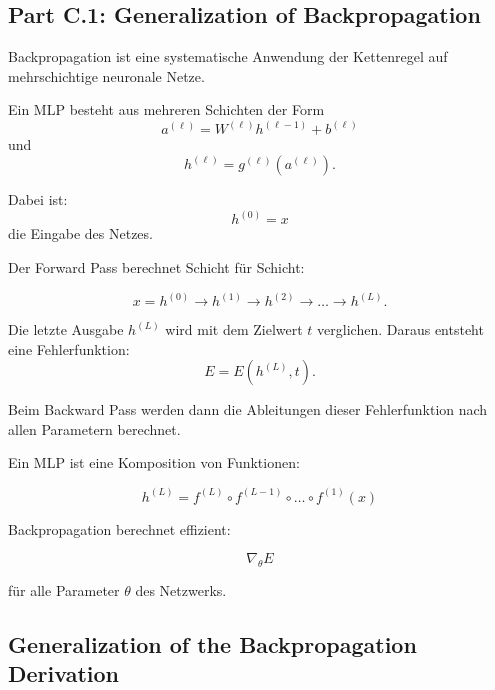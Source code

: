 \documentclass[11pt,a4paper]{scrartcl}
\begin{document}
\subsection{Part C.1: Generalization of Backpropagation}

\begin{notebox}
    Backpropagation ist eine systematische Anwendung der Kettenregel auf
    mehrschichtige neuronale Netze.

    Ein MLP besteht aus mehreren Schichten der Form
    \[
        a^{(\ell)}
        =
        W^{(\ell)}h^{(\ell-1)} + b^{(\ell)}
    \]
    und
    \[
        h^{(\ell)}
        =
        g^{(\ell)}(a^{(\ell)}).
    \]

    Dabei ist:
    \[
        h^{(0)} = x
    \]
    die Eingabe des Netzes.
\end{notebox}

\begin{solutionbox}
    Der Forward Pass berechnet Schicht für Schicht:

    \[
        x = h^{(0)}
        \longrightarrow
        h^{(1)}
        \longrightarrow
        h^{(2)}
        \longrightarrow
        \dots
        \longrightarrow
        h^{(L)}.
    \]

    Die letzte Ausgabe \(h^{(L)}\) wird mit dem Zielwert \(t\) verglichen.
    Daraus entsteht eine Fehlerfunktion:
    \[
        E = E(h^{(L)},t).
    \]

    Beim Backward Pass werden dann die Ableitungen dieser Fehlerfunktion nach
    allen Parametern berechnet.
\end{solutionbox}

\begin{answerbox}
    Ein MLP ist eine Komposition von Funktionen:

    \[
        \boxed{
            h^{(L)}
            =
            f^{(L)} \circ f^{(L-1)} \circ \dots \circ f^{(1)}(x)
        }
    \]

    Backpropagation berechnet effizient:

    \[
        \boxed{
            \nabla_\theta E
        }
    \]

    für alle Parameter \(\theta\) des Netzwerks.
\end{answerbox}

\subsection{Generalization of the Backpropagation Derivation}
\end{document}
